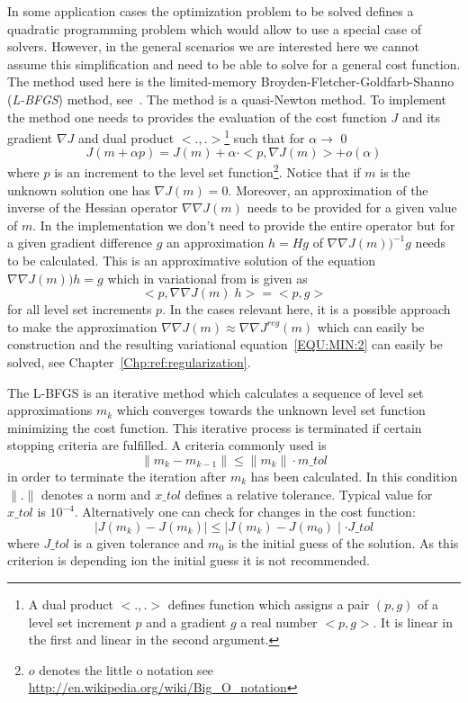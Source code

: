 In some application cases the optimization problem to be solved defines a quadratic programming problem which would allow
to use a special case of solvers. However, in the general scenarios we are interested here we cannot assume this
simplification and need to be able to solve for a general cost function.
The method used here is the limited-memory Broyden-Fletcher-Goldfarb-Shanno (\emph{L-BFGS}) method, see~\cite{Nocedal1980}. 
The method is a quasi-Newton method.
To implement the method one needs to provides the evaluation of the cost function $J$ and its gradient $\nabla J$
and dual product $<.,.>$\footnote{A dual product $<.,.>$ defines function which assigns 
a pair $(p,g)$ of a level set increment $p$ and a gradient $g$ a real number $<p,g>$. It is linear 
in the first and linear in the second argument.}
such that for $\alpha \to$ 0 
\begin{equation}\label{EQU:MIN:1}
J(m+\alpha p) = J(m) + \alpha \cdot < p , \nabla J(m)> + o(\alpha)
\end{equation}  
where $p$ is an increment to the level set 
function\footnote{ $o$ denotes the little o notation see \url{http://en.wikipedia.org/wiki/Big_O_notation}}.
Notice that if $m$ is the unknown solution one has $\nabla J(m)=0$. 
Moreover, an approximation of the inverse of the Hessian operator $\nabla \nabla J(m)$ needs to be provided
for a given value of  $m$. In the implementation we don't need to provide the entire operator but 
for a given gradient difference $g$ an approximation $h=Hg$ of $\nabla \nabla J(m))^{-1}g$ needs to be 
calculated. This is an approximative solution of the equation $\nabla \nabla J(m)) h =g$ which in variational
from is given as 
\begin{equation}\label{EQU:MIN:2}
<p, \nabla \nabla J(m)\; h > = <p, g>
\end{equation}
for all level set increments $p$. In the cases relevant here, it is a possible approach to 
make the approximation $\nabla \nabla J(m) \approx \nabla \nabla J^{reg}(m)$ which can easily be construction 
and the resulting variational equation~\ref{EQU:MIN:2} can easily be solved, see Chapter~\ref{Chp:ref:regularization}.

The L-BFGS is an iterative method which calculates a sequence of level set approximations $m_{k}$ which converges 
towards the unknown level set function minimizing the cost function. 
This iterative process is terminated if certain stopping criteria are fulfilled. A criteria
commonly used is
\begin{equation}\label{EQU:MIN:3a}
\| m_k - m_{k-1} \| \le \|m_k\| \cdot {m\_tol} 
\end{equation}
in order to terminate the iteration after $m_k$ has been calculated. In this condition $\|.\|$ denotes a 
norm and $x\_tol$ defines a relative tolerance. Typical value for  $x\_tol$ is $10^{-4}$. Alternatively
one can check for changes in the cost function:
\begin{equation}\label{EQU:MIN:3b}
\mid J(m_k) - J(m_k) \mid \le \mid J(m_k) - J(m_0) \mid  \cdot {J\_tol}  
\end{equation}
where ${J\_tol}$ is a given tolerance and $m_0$ is the initial guess of the solution. 
As this criterion is depending ion the initial guess it is not recommended. 

